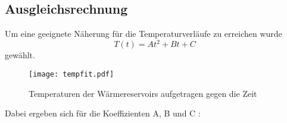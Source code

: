 \subsection{Ausgleichsrechnung}
Um eine geeignete Näherung für die Temperaturverläufe zu erreichen wurde
\begin{equation}
  \label{eq:tempfit}
  T(t) = At^2 + Bt + C
\end{equation}
gewählt.
\begin{figure}[H]
  \centering
  \texttt{[image: tempfit.pdf]}
  \caption{Temperaturen der Wärmereservoirs aufgetragen gegen die Zeit}
  \label{fig:tempfit}
\end{figure}
Dabei ergeben sich für die Koeffizienten A, B und C :
